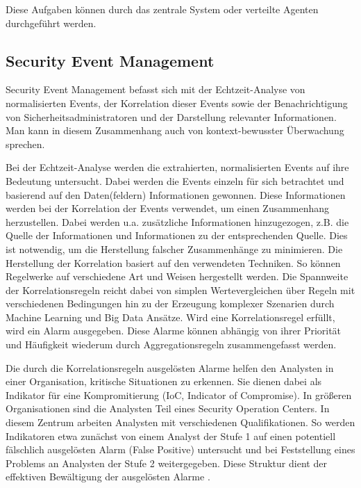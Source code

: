 Diese Aufgaben können durch das zentrale System oder verteilte Agenten durchgeführt werden. 

\subsection{Security Event Management}
\label{cha:Security Event Management}

Security Event Management befasst sich mit der Echtzeit-Analyse von normalisierten Events, der Korrelation dieser Events sowie der Benachrichtigung von Sicherheitsadministratoren und der Darstellung relevanter Informationen. Man kann in diesem Zusammenhang auch von kontext-bewusster Überwachung sprechen. %

Bei der Echtzeit-Analyse werden die extrahierten, normalisierten Events auf ihre Bedeutung untersucht. Dabei werden die Events einzeln für sich betrachtet und basierend auf den Daten(feldern) Informationen gewonnen. Diese Informationen werden bei der Korrelation der Events verwendet, um einen Zusammenhang herzustellen. Dabei werden u.a. zusätzliche Informationen hinzugezogen, z.B. die Quelle der Informationen und Informationen zu der entsprechenden Quelle.
Dies ist notwendig, um die Herstellung falscher Zusammenhänge zu minimieren. Die Herstellung der Korrelation basiert auf den verwendeten Techniken. So können Regelwerke auf verschiedene Art und Weisen hergestellt werden. Die Spannweite der Korrelationsregeln reicht dabei von simplen Wertevergleichen über Regeln mit verschiedenen Bedingungen hin zu der Erzeugung komplexer Szenarien durch Machine Learning und Big Data Ansätze. Wird eine Korrelationsregel erfüllt, wird ein Alarm ausgegeben. Diese Alarme können abhängig von ihrer Priorität und Häufigkeit wiederum durch Aggregationsregeln zusammengefasst werden.

Die durch die Korrelationsregeln ausgelösten Alarme helfen den Analysten in einer Organisation, kritische Situationen zu erkennen. Sie dienen dabei als Indikator für eine Kompromitierung (IoC, Indicator of Compromise). In größeren Organisationen sind die Analysten Teil eines \glqq Security Operation Centers\grqq . In diesem Zentrum arbeiten Analysten mit verschiedenen Qualifikationen. So werden Indikatoren etwa zunächst von einem Analyst der Stufe 1 auf einen potentiell fälschlich ausgelösten Alarm (False Positive) untersucht und bei Feststellung eines Problems an Analysten der Stufe 2 weitergegeben. Diese Struktur dient der effektiven Bewältigung der ausgelösten Alarme \citep{6924640}.


